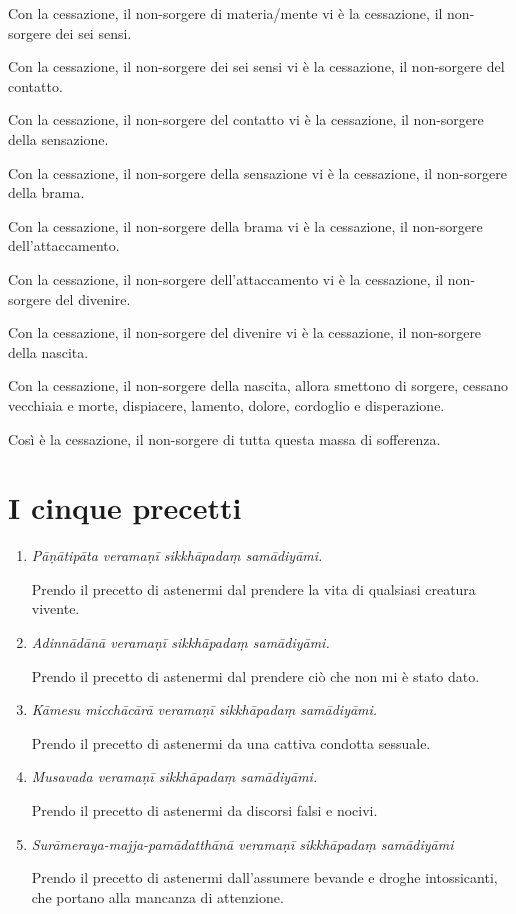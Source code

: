 Con la cessazione, il non-sorgere di materia/mente vi è la cessazione, il non-sorgere dei sei sensi.

Con la cessazione, il non-sorgere dei sei sensi vi è la cessazione, il non-sorgere del contatto.

Con la cessazione, il non-sorgere del contatto vi è la cessazione, il non-sorgere della sensazione.

Con la cessazione, il non-sorgere della sensazione vi è la cessazione, il non-sorgere della brama.

Con la cessazione, il non-sorgere della brama vi è la cessazione, il non-sorgere dell'attaccamento.

Con la cessazione, il non-sorgere dell'attaccamento vi è la cessazione, il non-sorgere del divenire.

Con la cessazione, il non-sorgere del divenire vi è la cessazione, il non-sorgere della nascita.

Con la cessazione, il non-sorgere della nascita, allora smettono di sorgere, cessano vecchiaia e morte, dispiacere, lamento, dolore, cordoglio e disperazione.

Così è la cessazione, il non-sorgere di tutta questa massa di sofferenza.

\section{I cinque precetti}
\vspace*{-1em}\noindent{}

\begin{enumerate}

\item \textit{Pāṇātipāta veramaṇī sikkhāpadaṃ samādiyāmi.}

Prendo il precetto di astenermi dal prendere la vita di qualsiasi creatura vivente.

\item \textit{Adinnādānā veramaṇī sikkhāpadaṃ samādiyāmi.}

Prendo il precetto di astenermi dal prendere ciò che non mi è stato dato.

\item \textit{Kāmesu micchācārā veramaṇī sikkhāpadaṃ samādiyāmi.}

Prendo il precetto di astenermi da una cattiva condotta sessuale.

\item \textit{Musavada veramaṇī sikkhāpadaṃ samādiyāmi.}

Prendo il precetto di astenermi da discorsi falsi e nocivi.

\item \textit{Surāmeraya-majja-pamādatthānā veramaṇī sikkhāpadaṃ samādiyāmi}

Prendo il precetto di astenermi dall'assumere bevande e droghe intossicanti, che portano alla mancanza di attenzione.
\end{enumerate}

